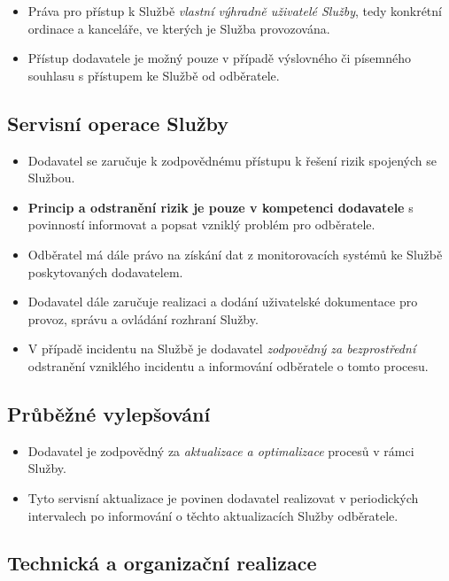\documentclass[11pt, a4paper, titlepage]{article}
\begin{document}
	\begin{itemize}
		\item Práva pro přístup k Službě \emph{vlastní výhradně uživatelé Služby}, tedy konkrétní ordinace a kanceláře, ve kterých je Služba provozována.
		\item Přístup dodavatele je možný pouze v případě výslovného či písemného souhlasu s přístupem ke Službě od odběratele.
	\end{itemize}

	\subsection*{Servisní operace Služby}

	\begin{itemize}
		\item Dodavatel se zaručuje k zodpovědnému přístupu k řešení rizik spojených se Službou.
		\item \textbf{Princip a odstranění rizik je pouze v kompetenci dodavatele} s povinností informovat a popsat vzniklý problém pro odběratele.
		\item Odběratel má dále právo na získání dat z monitorovacích systémů ke Službě poskytovaných dodavatelem.
		\item Dodavatel dále zaručuje realizaci a dodání uživatelské dokumentace pro provoz, správu a ovládání rozhraní Služby.
		\item V případě incidentu na Službě je dodavatel \emph{zodpovědný za bezprostřední} odstranění vzniklého incidentu a informování odběratele o tomto procesu.
	\end{itemize}

	\subsection*{Průběžné vylepšování}

	\begin{itemize}
		\item Dodavatel je zodpovědný za \emph{aktualizace a optimalizace} procesů v rámci Služby.
		\item Tyto servisní aktualizace je povinen dodavatel realizovat v periodických intervalech po informování o těchto aktualizacích Služby odběratele.  
	\end{itemize}

	\subsection*{Technická a organizační realizace}
\end{document}
